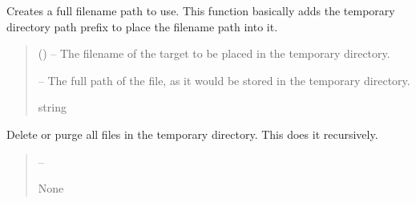 \documentclass[letterpaper,11pt,english]{sphinxmanual}
\begin{document}
\begin{savenotes}\begin{fulllineitems}
\label{\detokenize{code/opihiexarata.library.temporary:opihiexarata.library.temporary.make_temporary_directory_path}}
\pysigstartsignatures
{}
\pysigstopsignatures
\sphinxAtStartPar
Creates a full filename path to use. This function basically adds the
temporary directory path prefix to place the filename path into it.
\begin{quote}\begin{description}
\sphinxAtStartPar
{} () – The filename of the target to be placed in the temporary directory.

\sphinxAtStartPar
{} – The full path of the file, as it would be stored in the temporary
directory.

\sphinxAtStartPar
string

\end{description}\end{quote}

\end{fulllineitems}\end{savenotes}


\begin{savenotes}\begin{fulllineitems}
\label{\detokenize{code/opihiexarata.library.temporary:opihiexarata.library.temporary.purge_temporary_directory}}
\pysigstartsignatures
{}
\pysigstopsignatures
\sphinxAtStartPar
Delete or purge all files in the temporary directory. This does it
recursively.
\begin{quote}\begin{description}
\sphinxAtStartPar
{} – 

\sphinxAtStartPar
None

\end{description}\end{quote}

\end{fulllineitems}\end{savenotes}
\end{document}
